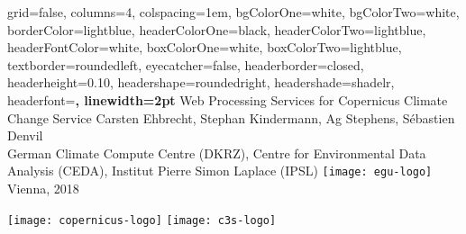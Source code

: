 \documentclass[landscape,a0paper,fontscale=0.4]{baposter} %
\begin{document}


\begin{poster}%
  {
  grid=false,
  columns=4,
  colspacing=1em,
  bgColorOne=white, %
  bgColorTwo=white, %
  borderColor=lightblue, %
  headerColorOne=black, %
  headerColorTwo=lightblue, %
  headerFontColor=white, %
  boxColorOne=white, %
  boxColorTwo=lightblue,
  textborder=roundedleft,
  eyecatcher=false, %
  headerborder=closed, %
  headerheight=0.10\textheight, %
  headershape=roundedright, %
  headershade=shadelr,
  headerfont=\Large\bf\textsf, %
  linewidth=2pt
  }
  {} %
  {\sf %
  Web Processing Services for Copernicus Climate Change Service
  }
  {\sf %
    Carsten Ehbrecht\footnotemark[1], Stephan Kindermann\footnotemark[1], Ag Stephens\footnotemark[2], Sébastien Denvil\footnotemark[3]\\
    {\smaller
      German Climate Compute Centre (DKRZ)\footnotemark[1],
      Centre for Environmental Data Analysis (CEDA)\footnotemark[2],
      Institut Pierre Simon Laplace (IPSL)\footnotemark[3]
    }
    \hspace{7em}
    \texttt{[image: egu-logo]} Vienna, 2018
  }
  {
    \begin{minipage}{30em}
      \hfill
      \texttt{[image: copernicus-logo]}
      \texttt{[image: c3s-logo]}
    \end{minipage}
  }


\end{poster}
\end{document}
